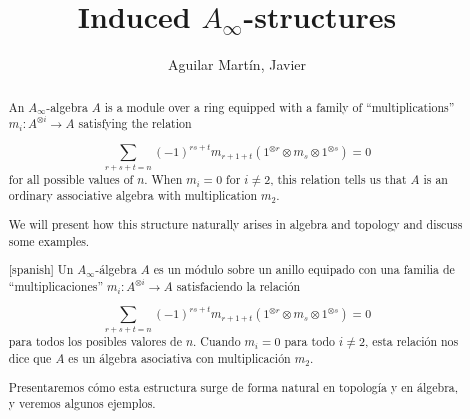 \documentclass[bibtex,babel-main=english]{TEMat-article}
\title[Short title]{Induced $A_\infty$-structures}
\author*{Aguilar Martín, Javier}
\affiliation{University of Kent}
\begin{document}
\begin{abstract}
An $A_\infty$-algebra $A$ is a module over a ring equipped with a family of ``multiplications'' $m_i:A^{\otimes i}\to A$ satisfying the relation

\[\sum_{r+s+t=n}(-1)^{rs+t}m_{r+1+t}(1^{\otimes r}\otimes m_s\otimes 1^{\otimes s})=0\]
for all possible values of $n$. When $m_i=0$ for $i\neq 2$, this relation tells us that $A$ is an ordinary associative algebra with multiplication $m_2$.%


We will present how this structure naturally arises in algebra and topology and discuss some examples. %
\end{abstract}

\begin{abstract}[spanish]
Un $A_\infty$-álgebra $A$ es un módulo sobre un anillo equipado con una familia de ``multiplicaciones'' $m_i:A^{\otimes i}\to A$ satisfaciendo la relación

\[\sum_{r+s+t=n}(-1)^{rs+t}m_{r+1+t}(1^{\otimes r}\otimes m_s\otimes 1^{\otimes s})=0\]
para todos los posibles valores de $n$. Cuando $m_i=0$ para todo $i\neq 2$, esta relación nos dice que $A$ es un álgebra asociativa con multiplicación $m_2$. 

Presentaremos cómo esta estructura surge de forma natural en topología y en álgebra, y veremos algunos ejemplos.
\end{abstract}
\end{document}
